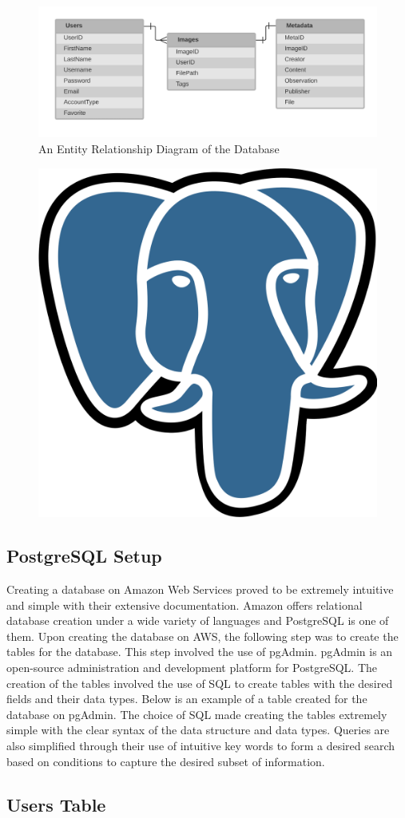 \documentclass[12pt]{report}
\begin{document}
\begin{enumerate}
\begin{figure}[h]
	\centering
	\includegraphics[width=\linewidth]{database}
	\caption{An Entity Relationship Diagram of the Database}
	\label{fig:ERD}
\end{figure}

\begin{figure}[h]
	\centering
	\includegraphics[width=0.251\linewidth]{postgresql}
\end{figure}

\subsection*{PostgreSQL Setup}

Creating a database on Amazon Web Services proved to be extremely intuitive and simple with their extensive documentation.  Amazon offers relational database creation under a wide variety of languages and PostgreSQL is one of them.  Upon creating the database on AWS, the following step was to create the tables for the database.  This step involved the use of pgAdmin.  pgAdmin is an open-source administration and development platform for PostgreSQL.  The creation of the tables involved the use of SQL to create tables with the desired fields and their data types.  Below is an example of a table created for the database on pgAdmin.  The choice of SQL made creating the tables extremely simple with the clear syntax of the data structure and data types.  Queries are also simplified through their use of intuitive key words to form a desired search based on conditions to capture the desired subset of information.

\subsection*{Users Table}


\end{enumerate}
\end{document}
